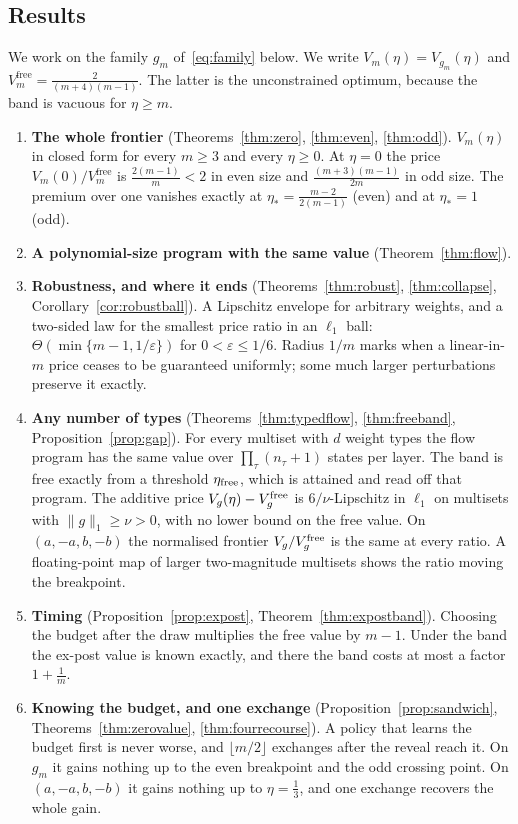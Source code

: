 \subsection{Results}

We work on the family $g_{m}$ of~\eqref{eq:family} below. We write
$V_{m}(\eta)=V_{g_{m}}(\eta)$ and $V^{\mathrm{free}}_{m}=\frac{2}{(m+4)(m-1)}$. The latter is
the unconstrained optimum, because the band is vacuous for $\eta\ge m$.

\begin{enumerate}
\item[1)] \textbf{The whole frontier} (Theorems~\ref{thm:zero}, \ref{thm:even},
\ref{thm:odd}). $V_{m}(\eta)$ in closed form for every $m\ge3$ and every $\eta\ge0$. At
$\eta=0$ the price $V_{m}(0)/V^{\mathrm{free}}_{m}$ is $\frac{2(m-1)}{m}<2$ in even size and
$\frac{(m+3)(m-1)}{2m}$ in odd size. The premium over one vanishes exactly at $\eta_{*}=\frac{m-2}{2(m-1)}$
(even) and at $\eta_{*}=1$ (odd).
\item[2)] \textbf{A polynomial-size program with the same value} (Theorem~\ref{thm:flow}).
\item[3)] \textbf{Robustness, and where it ends} (Theorems~\ref{thm:robust},
\ref{thm:collapse}, Corollary~\ref{cor:robustball}). A Lipschitz envelope for arbitrary
weights, and a two-sided law for the smallest price ratio in an $\ell_1$ ball:
$\Theta(\min\{m-1,1/\varepsilon\})$ for $0<\varepsilon\le1/6$.
Radius $1/m$ marks when a linear-in-$m$ price ceases to be guaranteed uniformly;
some much larger perturbations preserve it exactly.
\item[4)] \textbf{Any number of types} (Theorems~\ref{thm:typedflow}, \ref{thm:freeband},
Proposition~\ref{prop:gap}). For every multiset with $d$ weight types the flow program has the
same value over $\prod_\tau(n_\tau+1)$ states per layer. The band is free exactly from a threshold
$\eta_{\rm free}$, which is attained and read off that program. The additive price
$V_g(\eta)-V^{\rm free}_g$ is $6/\nu$-Lipschitz in $\ell_1$ on multisets with $\|g\|_1\ge\nu>0$, with
no lower bound on the free value.
On $(a,-a,b,-b)$ the normalised frontier $V_g/V_g^{\rm free}$ is the same at every ratio. A floating-point map of larger
two-magnitude multisets shows the ratio moving the breakpoint.
\item[5)] \textbf{Timing} (Proposition~\ref{prop:expost}, Theorem~\ref{thm:expostband}).
Choosing the budget after the draw multiplies the free value by $m-1$. Under the band the
ex-post value is known exactly, and there the band costs at most a factor $1+\frac1m$.
\item[6)] \textbf{Knowing the budget, and one exchange} (Proposition~\ref{prop:sandwich},
Theorems~\ref{thm:zerovalue}, \ref{thm:fourrecourse}). A policy that learns the budget first
is never worse, and $\lfloor m/2\rfloor$ exchanges after the reveal reach it. On $g_m$ it gains
nothing up to the even breakpoint and the odd crossing point. On $(a,-a,b,-b)$ it gains nothing
up to $\eta=\frac13$, and one exchange recovers the whole gain.
\end{enumerate}

